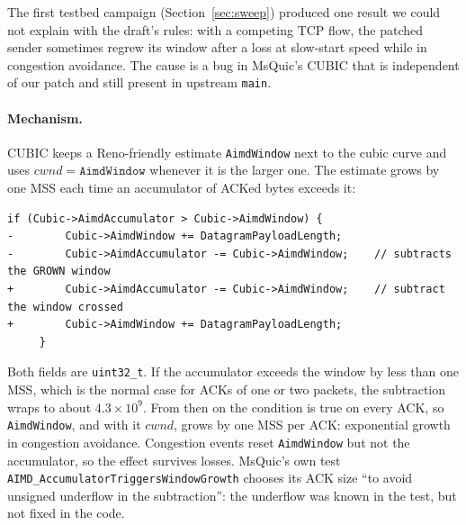 \documentclass[11pt,a4paper]{article}
\newcommand{\cwnd}{\ensuremath{\mathit{cwnd}}}
\begin{document}
The first testbed campaign (Section~\ref{sec:sweep}) produced one result we
could not explain with the draft's rules: with a competing TCP flow, the
patched sender sometimes regrew its window after a loss at slow-start speed
while in congestion avoidance. The cause is a bug in MsQuic's CUBIC that is
independent of our patch and still present in upstream \texttt{main}.

\paragraph{Mechanism.} CUBIC keeps a Reno-friendly estimate
\texttt{AimdWindow} next to the cubic curve and uses
$\cwnd = \texttt{AimdWindow}$ whenever it is the larger one. The estimate
grows by one MSS each time an accumulator of ACKed bytes exceeds it:

\begin{lstlisting}[style=diff]
     if (Cubic->AimdAccumulator > Cubic->AimdWindow) {
-        Cubic->AimdWindow += DatagramPayloadLength;
-        Cubic->AimdAccumulator -= Cubic->AimdWindow;    // subtracts the GROWN window
+        Cubic->AimdAccumulator -= Cubic->AimdWindow;    // subtract the window crossed
+        Cubic->AimdWindow += DatagramPayloadLength;
     }
\end{lstlisting}

Both fields are \texttt{uint32\_t}. If the accumulator exceeds the window by
less than one MSS, which is the normal case for ACKs of one or two packets,
the subtraction wraps to about $4.3\times10^9$. From then on the condition is
true on every ACK, so \texttt{AimdWindow}, and with it \cwnd, grows by one MSS
per ACK: exponential growth in congestion avoidance. Congestion events reset
\texttt{AimdWindow} but not the accumulator, so the effect survives losses.
MsQuic's own test \texttt{AIMD\_AccumulatorTriggersWindowGrowth} chooses its
ACK size ``to avoid unsigned underflow in the subtraction'': the underflow
was known in the test, but not fixed in the code.
\end{document}
